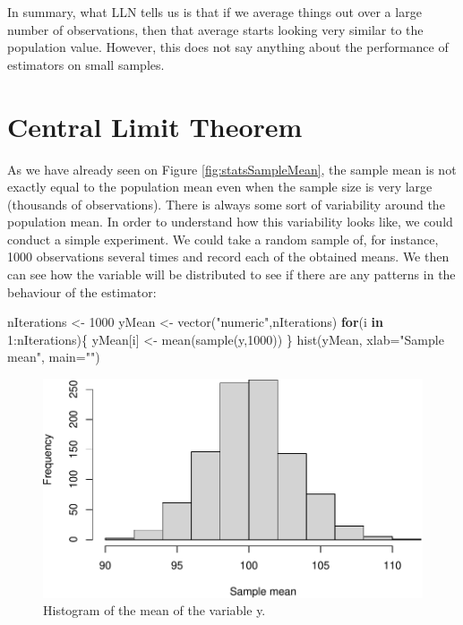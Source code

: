 \documentclass[
]{book}
\newenvironment{Shaded}{\begin{snugshade}}{\end{snugshade}}
\newcommand{\AttributeTok}[1]{\textcolor[rgb]{0.77,0.63,0.00}{#1}}
\newcommand{\ControlFlowTok}[1]{\textcolor[rgb]{0.13,0.29,0.53}{\textbf{#1}}}
\newcommand{\DecValTok}[1]{\textcolor[rgb]{0.00,0.00,0.81}{#1}}
\newcommand{\FunctionTok}[1]{\textcolor[rgb]{0.00,0.00,0.00}{#1}}
\newcommand{\NormalTok}[1]{#1}
\newcommand{\OtherTok}[1]{\textcolor[rgb]{0.56,0.35,0.01}{#1}}
\newcommand{\SpecialCharTok}[1]{\textcolor[rgb]{0.00,0.00,0.00}{#1}}
\newcommand{\StringTok}[1]{\textcolor[rgb]{0.31,0.60,0.02}{#1}}
\theoremstyle{definition}
\theoremstyle{definition}
\theoremstyle{definition}
\theoremstyle{definition}
\theoremstyle{remark}
\begin{document}
In summary, what LLN tells us is that if we average things out over a large number of observations, then that average starts looking very similar to the population value. However, this does not say anything about the performance of estimators on small samples.

\hypertarget{CLT}{%
\section{Central Limit Theorem}\label{CLT}}

As we have already seen on Figure \ref{fig:statsSampleMean}, the sample mean is not exactly equal to the population mean even when the sample size is very large (thousands of observations). There is always some sort of variability around the population mean. In order to understand how this variability looks like, we could conduct a simple experiment. We could take a random sample of, for instance, 1000 observations several times and record each of the obtained means. We then can see how the variable will be distributed to see if there are any patterns in the behaviour of the estimator:

\begin{Shaded}
\begin{Highlighting}[]
\NormalTok{nIterations }\OtherTok{\textless{}{-}} \DecValTok{1000}
\NormalTok{yMean }\OtherTok{\textless{}{-}} \FunctionTok{vector}\NormalTok{(}\StringTok{"numeric"}\NormalTok{,nIterations)}
\ControlFlowTok{for}\NormalTok{(i }\ControlFlowTok{in} \DecValTok{1}\SpecialCharTok{:}\NormalTok{nIterations)\{}
\NormalTok{    yMean[i] }\OtherTok{\textless{}{-}} \FunctionTok{mean}\NormalTok{(}\FunctionTok{sample}\NormalTok{(y,}\DecValTok{1000}\NormalTok{))}
\NormalTok{\}}
\FunctionTok{hist}\NormalTok{(yMean, }\AttributeTok{xlab=}\StringTok{"Sample mean"}\NormalTok{, }\AttributeTok{main=}\StringTok{""}\NormalTok{)}
\end{Highlighting}
\end{Shaded}

\begin{figure}
\centering
\includegraphics{Svetunkov---Statistics-for-Business-Analytics_files/figure-latex/histyMean-1.pdf}
\caption{\label{fig:histyMean}Histogram of the mean of the variable y.}
\end{figure}
\end{document}
